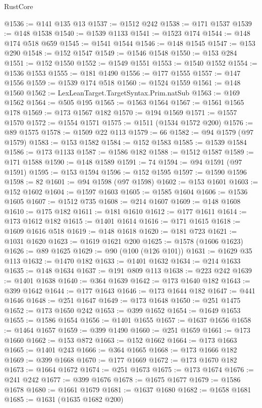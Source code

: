 \begin{lexlean}{RustCore}
\begin{coremodule}
@1536 := @141 @135 @13
@1537 := @1512 @242
@1538 := @171 @1537
@1539 := @148 @1538
@1540 := @1539 @1133
@1541 := @1523 @174
@1544 := @148 @174 @518 @659
@1545 := @1541 @1544
@1546 := @148 @1545
@1547 := @153 @290
@1548 := @152 @1547
@1549 := @1546 @1548
@1550 := @153 @284
@1551 := @152 @1550
@1552 := @1549 @1551
@1553 := @1540 @1552
@1554 := @1536 @1553
@1555 := @181 @1490
@1556 := @177 @1555
@1557 := @147 @1556
@1559 := @1539 @174 @518
@1560 := @1524 @1559
@1561 := @148 @1560
@1562 := LexLeanTarget.TargetSyntax.Prim.natSub
@1563 := @169 @1562
@1564 := @505 @195
@1565 := @1563 @1564
@1567 := @1561 @1565 @178
@1569 := @173 @1567 @182
@1570 := @194 @1569
@1571 := @1557 @1570
@1572 := @1554 @1571
@1575 := @1511 (@1534 @1572 @200)
@1576 := @89 @1575
@1578 := @1509 @22 @113
@1579 := 66
@1582 := @94 @1579 (@97 @1579)
@1583 := @153 @1582
@1584 := @152 @1583
@1585 := @1539 @1584
@1586 := @173 @1133
@1587 := @1586 @182
@1588 := @1512 @1587
@1589 := @171 @1588
@1590 := @148 @1589
@1591 := 74
@1594 := @94 @1591 (@97 @1591)
@1595 := @153 @1594
@1596 := @152 @1595
@1597 := @1590 @1596
@1598 := 82
@1601 := @94 @1598 (@97 @1598)
@1602 := @153 @1601
@1603 := @152 @1602
@1604 := @1597 @1603
@1605 := @1585 @1604
@1606 := @1536 @1605
@1607 := @1512 @735
@1608 := @214 @1607
@1609 := @148 @1608
@1610 := @175 @182
@1611 := @181 @1610
@1612 := @177 @1611
@1614 := @173 @1612 @182
@1615 := @1401 @1614
@1616 := @171 @1615
@1618 := @1609 @1616 @518
@1619 := @148 @1618
@1620 := @181 @723
@1621 := @1031 @1620
@1623 := @1619 @1621 @200
@1625 := @1578 (@1606 @1623)
@1626 := @89 @1625
@1629 := @90 (@100 (@126 @101))
@1631 := @1629 @35 @113
@1632 := @1470 @182
@1633 := @1401 @1632
@1634 := @214 @1633
@1635 := @148 @1634
@1637 := @191 @809 @113
@1638 := @223 @242
@1639 := @1401 @1638
@1640 := @364 @1639
@1642 := @173 @1640 @182
@1643 := @399 @1642
@1644 := @177 @1643
@1646 := @173 @1644 @182
@1647 := @441 @1646
@1648 := @251 @1647
@1649 := @173 @1648
@1650 := @251 @1475
@1652 := @173 @1650 @242
@1653 := @399 @1652
@1654 := @1649 @1653
@1655 := @1586 @1654
@1656 := @1401 @1655
@1657 := @1637 @1656
@1658 := @1464 @1657
@1659 := @399 @1490
@1660 := @251 @1659
@1661 := @173 @1660
@1662 := @153 @872
@1663 := @152 @1662
@1664 := @173 @1663
@1665 := @1401 @243
@1666 := @364 @1665
@1668 := @173 @1666 @182
@1669 := @399 @1668
@1670 := @177 @1669
@1672 := @173 @1670 @182
@1673 := @1664 @1672
@1674 := @251 @1673
@1675 := @173 @1674
@1676 := @241 @242
@1677 := @399 @1676
@1678 := @1675 @1677
@1679 := @1586 @1678
@1680 := @1661 @1679
@1681 := @1637 @1680
@1682 := @1658 @1681
@1685 := @1631 (@1635 @1682 @200)

\end{coremodule}
\end{lexlean}
